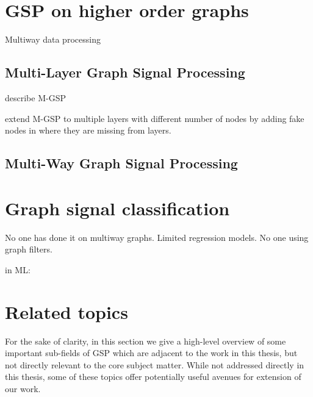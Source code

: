 \cite{Le2022}



\section{GSP on higher order graphs}

Multiway data processing 

\cite{Smilde2004}
\cite{Kroonenberg2008}


\cite{Ji2019}

\cite{Cammoun2009}


\subsection{Multi-Layer Graph Signal Processing}

\cite{Zhang2022} describe M-GSP 

\cite{Zhang2018} extend M-GSP to multiple layers with different number of nodes by adding fake nodes in where they are missing from layers. 
 

\subsection{Multi-Way Graph Signal Processing}


\cite{Zhao2023}

\cite{Li2012}



\section{Graph signal classification}

\cite{Tran2020}

\cite{Sandryhaila2013a}

\citep{Ahmed2017}

No one has done it on multiway graphs. Limited regression models. No one using graph filters. 

in ML: \citep{Belkin2002}




\section{Related topics}

For the sake of clarity, in this section we give a high-level overview of some important sub-fields of GSP which are adjacent to the work in this thesis, but not directly relevant to the core subject matter. While not addressed directly in this thesis, some of these topics offer potentially useful avenues for extension of our work. 


